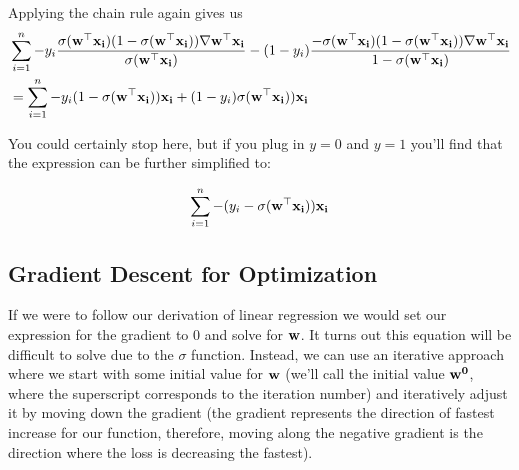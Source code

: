 \documentclass[assignment03_Solutions]{subfiles}
\begin{document}
\begin{exercise}[(60 minutes)]
\begin{boxedsolution}
Applying the chain rule again gives us
\begin{align}
& \sum_{i=1}^n -y_i \frac{\sigma( \mathbf{w}^\top \mathbf{x_i})(1-\sigma( \mathbf{w}^\top \mathbf{x_i}))\nabla \mathbf{w}^\top \mathbf{x_i}}{\sigma( \mathbf{w}^\top \mathbf{x_i})} - (1-y_i) \frac{- \sigma( \mathbf{w}^\top \mathbf{x_i})(1-\sigma( \mathbf{w}^\top \mathbf{x_i}))\nabla \mathbf{w}^\top \mathbf{x_i}}{1 - \sigma( \mathbf{w}^\top \mathbf{x_i})} \nonumber \\
 &= \sum_{i=1}^n -y_i (1-\sigma( \mathbf{w}^\top \mathbf{x_i}))\mathbf{x_i} + (1-y_i)  \sigma( \mathbf{w}^\top \mathbf{x_i})) \mathbf{x_i} 
 \end{align}
 
You could certainly stop here, but if you plug in $y=0$ and $y=1$ you'll find that the expression can be further simplified to:
 
 \begin{align}
\sum_{i=1}^n  -(y_i - \sigma(\mathbf{w}^\top \mathbf{x_i})) \mathbf{x_i} \nonumber
 \end{align}


\end{boxedsolution}

\ees
\end{exercise}


\subsection{Gradient Descent for Optimization}
If we were to follow our derivation of linear regression we would set our expression for the gradient to 0 and solve for $\mathbf{w}$.  It turns out this equation will be difficult to solve due to the $\sigma$ function.  Instead, we can use an iterative approach where we start with some initial value for $\mathbf{w}$ (we'll call the initial value $\mathbf{w^0}$, where the superscript corresponds to the iteration number) and iteratively adjust it by moving down the gradient (the gradient represents the direction of fastest increase for our function, therefore, moving along the negative gradient is the direction where the loss is decreasing the fastest).
\end{document}
